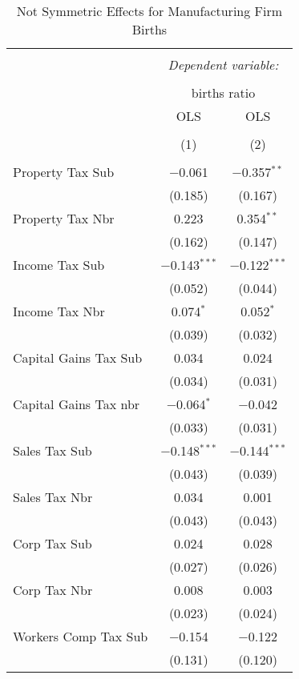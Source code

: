 
\begin{table}[!htbp] \centering 
  \caption{Not Symmetric Effects for  Manufacturing Firm Births} 
  \label{} 
\begin{tabular}{@{\extracolsep{5pt}}lcc} 
\\[-1.8ex]\hline 
\hline \\[-1.8ex] 
 & \multicolumn{2}{c}{\textit{Dependent variable:}} \\ 
\cline{2-3} 
\\[-1.8ex] & \multicolumn{2}{c}{births ratio} \\ 
 & OLS & OLS \\ 
\\[-1.8ex] & (1) & (2)\\ 
\hline \\[-1.8ex] 
 Property Tax Sub & $-$0.061 & $-$0.357$^{**}$ \\ 
  & (0.185) & (0.167) \\ 
  Property Tax Nbr & 0.223 & 0.354$^{**}$ \\ 
  & (0.162) & (0.147) \\ 
  Income Tax Sub & $-$0.143$^{***}$ & $-$0.122$^{***}$ \\ 
  & (0.052) & (0.044) \\ 
  Income Tax Nbr & 0.074$^{*}$ & 0.052$^{*}$ \\ 
  & (0.039) & (0.032) \\ 
  Capital Gains Tax Sub & 0.034 & 0.024 \\ 
  & (0.034) & (0.031) \\ 
  Capital Gains Tax nbr & $-$0.064$^{*}$ & $-$0.042 \\ 
  & (0.033) & (0.031) \\ 
  Sales Tax Sub & $-$0.148$^{***}$ & $-$0.144$^{***}$ \\ 
  & (0.043) & (0.039) \\ 
  Sales Tax Nbr & 0.034 & 0.001 \\ 
  & (0.043) & (0.043) \\ 
  Corp Tax Sub & 0.024 & 0.028 \\ 
  & (0.027) & (0.026) \\ 
  Corp Tax Nbr & 0.008 & 0.003 \\ 
  & (0.023) & (0.024) \\ 
  Workers Comp Tax Sub & $-$0.154 & $-$0.122 \\ 
  & (0.131) & (0.120) \\ 

\end{tabular}
\end{table}
